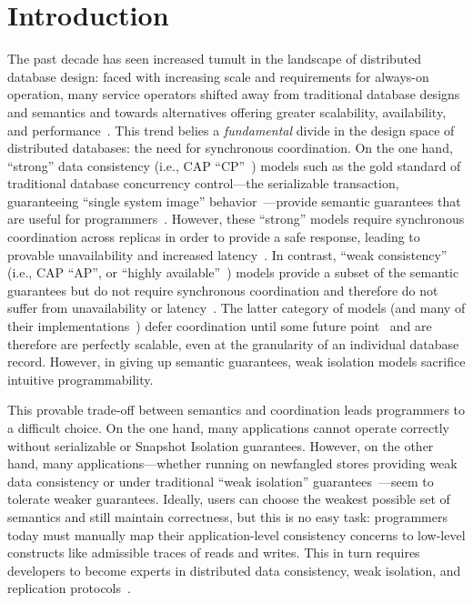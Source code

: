 
\section{Introduction}
\label{sec:intro}

The past decade has seen increased tumult in the landscape of
distributed database design: faced with increasing scale and
requirements for always-on operation, many service operators shifted
away from traditional database designs and semantics and towards
alternatives offering greater scalability, availability, and
performance~\cite{dynamo,bigtable,cassandra,brewer-base}. This trend
belies a \textit{fundamental} divide in the design space of
distributed databases: the need for synchronous coordination. On the
one hand, ``strong'' data consistency (i.e., CAP
``CP''~\cite{gilbert-cap}) models such as the gold standard of
traditional database concurrency control---the serializable
transaction, guaranteeing ``single system image''
behavior~\cite{gray-virtues}---provide semantic guarantees that are
useful for programmers~\cite{bernstein-book}. However, these
``strong'' models require synchronous coordination across replicas in
order to provide a safe response, leading to provable unavailability
and increased latency~\cite{pacelc}. In contrast, ``weak consistency''
(i.e., CAP ``AP'', or ``highly available''~\cite{gilbert-cap}) models
provide a subset of the semantic guarantees but do not require
synchronous coordination and therefore do not suffer from
unavailability or latency~\cite{hat-vldb}. The latter category of
models (and many of their implementations~\cite{swift}) defer
coordination until some future point~\cite{calm,consistency-borders}
and are therefore are perfectly scalable, even at the granularity of
an individual database record. However, in giving up semantic
guarantees, weak isolation models sacrifice intuitive programmability.

This provable trade-off between semantics and coordination leads
programmers to a difficult choice. On the one hand, many applications
cannot operate correctly without serializable or Snapshot Isolation
guarantees. However, on the other hand, many applications---whether
running on newfangled stores providing weak data consistency or under
traditional ``weak isolation'' guarantees~\cite{adya-isolation}---seem
to tolerate weaker guarantees. Ideally, users can choose the weakest
possible set of semantics and still maintain correctness, but this is
no easy task: programmers today must manually map their
application-level consistency concerns to low-level constructs like
admissible traces of reads and writes. This in turn requires
developers to become experts in distributed data consistency, weak
isolation, and replication protocols~\cite{consistency-borders}.

